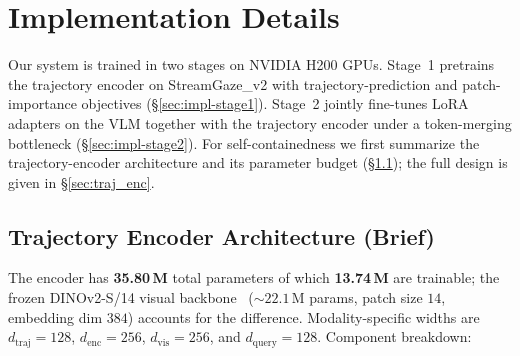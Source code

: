 \section{Implementation Details}
\label{sec:impl}

Our system is trained in two stages on NVIDIA H200 GPUs. Stage~1 pretrains
the trajectory encoder on StreamGaze\_v2 with trajectory-prediction and
patch-importance objectives (\S\ref{sec:impl-stage1}). Stage~2 jointly
fine-tunes LoRA adapters on the VLM together with the trajectory encoder
under a token-merging bottleneck (\S\ref{sec:impl-stage2}). For
self-containedness we first summarize the trajectory-encoder architecture
and its parameter budget (\S\ref{sec:impl-arch}); the full design is given
in \S\ref{sec:traj_enc}.

\subsection{Trajectory Encoder Architecture (Brief)}
\label{sec:impl-arch}
The encoder has \textbf{35.80\,M} total parameters of which
\textbf{13.74\,M} are trainable; the frozen DINOv2-S/14 visual
backbone~\citep{oquab2023dinov2} (${\sim}22.1$\,M params, patch size $14$,
embedding dim $384$) accounts for the difference. Modality-specific widths
are $d_\text{traj}{=}128$, $d_\text{enc}{=}256$, $d_\text{vis}{=}256$, and
$d_\text{query}{=}128$. Component breakdown:

